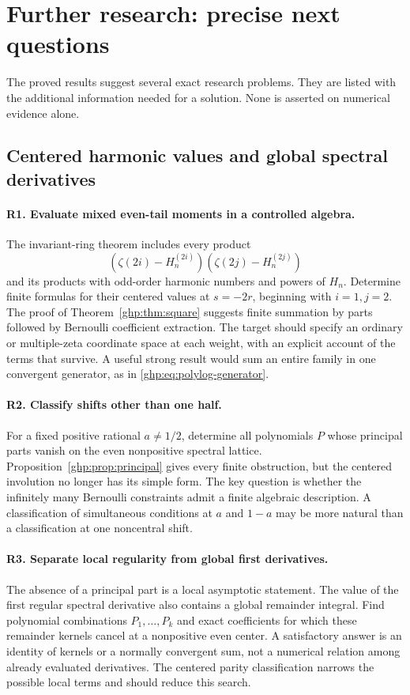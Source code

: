 \section{Further research: precise next questions}
\label{research:section}

The proved results suggest several exact research problems.
They are listed with the additional information needed for
a solution. None is asserted on numerical evidence alone.

\subsection{Centered harmonic values and global spectral derivatives}

\paragraph{R1. Evaluate mixed even-tail moments in a controlled algebra.}
The invariant-ring theorem includes every product
\[
 (\zeta(2i)-H_n^{(2i)})(\zeta(2j)-H_n^{(2j)})
\]
and its products with odd-order harmonic numbers and powers
of $H_n$. Determine finite formulas for their centered
values at $s=-2r$, beginning with $i=1,j=2$.
The proof of Theorem~\ref{ghp:thm:square} suggests finite
summation by parts followed by Bernoulli coefficient
extraction. The target should specify an ordinary or
multiple-zeta coordinate space at each weight, with an
explicit account of the terms that survive. A useful
strong result would sum an entire family in one convergent
generator, as in \eqref{ghp:eq:polylog-generator}.

\paragraph{R2. Classify shifts other than one half.}
For a fixed positive rational $a\ne1/2$, determine all
polynomials $P$ whose principal parts vanish on the even
nonpositive spectral lattice. Proposition~\ref{ghp:prop:principal}
gives every finite obstruction, but the centered involution
no longer has its simple form. The key question is whether
the infinitely many Bernoulli constraints admit a finite
algebraic description. A classification of simultaneous
conditions at $a$ and $1-a$ may be more natural than a
classification at one noncentral shift.

\paragraph{R3. Separate local regularity from global first derivatives.}
The absence of a principal part is a local asymptotic
statement. The value of the first regular spectral
derivative also contains a global remainder integral.
Find polynomial combinations $P_1,\ldots,P_k$ and exact
coefficients for which these remainder kernels cancel
at a nonpositive even center. A satisfactory answer is
an identity of kernels or a normally convergent sum,
not a numerical relation among already evaluated
derivatives. The centered parity classification narrows
the possible local terms and should reduce this search.

